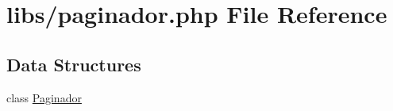 \hypertarget{paginador_8php}{}\section{libs/paginador.php File Reference}
\label{paginador_8php}
\subsection*{Data Structures}
\begin{DoxyCompactItemize}
\item 
class \hyperlink{class_paginador}{Paginador}
\end{DoxyCompactItemize}
